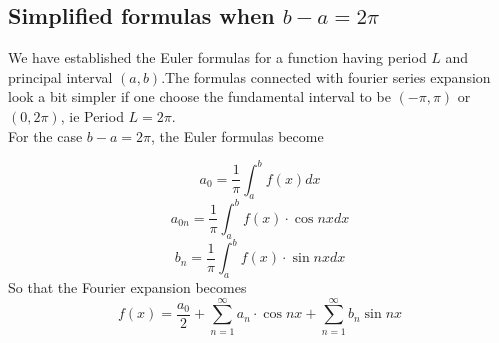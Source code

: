 \subsection{Simplified formulas when $b-a=2\pi$}

We have established the Euler formulas for a function having period $L$ and principal interval $(a,b)$.The formulas connected with fourier series expansion look a bit simpler if one choose the fundamental interval to be $(-\pi,\pi)$ or $(0,2\pi)$, ie Period $L=2\pi$.\\For the case $b-a=2\pi$, the Euler formulas become

	
\begin{theorem}\label{pareq}


\begin{equation}
a_{0}=\frac{1}{\pi} \int_{a}^{b} f(x) d x
\end{equation}
\begin{equation}
a_{0n}=\frac{1}{\pi} \int_{a}^{b} f(x) \cdot \cos n x d x
\end{equation}
\begin{equation}
b_{n}=\frac{1}{\pi} \int_{a}^{b} f(x) \cdot \sin n x d x
\end{equation}
So that the Fourier expansion becomes 
\begin{equation}
f(x)=\frac{a_{0}}{2}+\sum_{n=1}^{\infty} a_{n} \cdot \cos n x+\sum_{n=1}^{\infty} b_{n} \sin n x
\end{equation}
\end{theorem}


